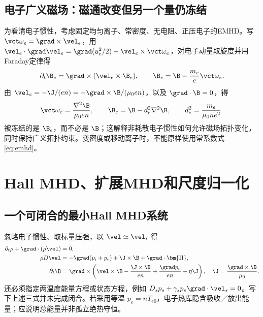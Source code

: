 \subsection{电子广义磁场：磁通改变但另一个量仍冻结}
为看清电子惯性，考虑固定均匀离子、常密度、无电阻、正压电子的EMHD。写 $\vct\omega_e=\grad\times\vel_e$，用
$\vel_e\cdot\grad\vel_e=\grad(u_e^2/2)-\vel_e\times\vct\omega_e$，对电子动量取旋度并用Faraday定律得
\begin{equation}\partial_t\B_e=\grad\times(\vel_e\times\B_e),\qquad
\B_e=\B-{m_e\over e}\vct\omega_e.\label{eq:be}
\end{equation}
由 $\vel_e=-\J/(en)=-\grad\times\B/(\mu_0en)$，以及 $\grad\cdot\B=0$，得
\begin{equation}\vct\omega_e={\nabla^2\B\over\mu_0en},\qquad
\B_e=\B-d_e^2\nabla^2\B,\qquad d_e^2={m_e\over\mu_0ne^2}.\label{eq:emhd}
\end{equation}
被冻结的是 $\B_e$，而不必是 $\B$；这解释非耗散电子惯性如何允许磁场拓扑变化，同时保持广义拓扑约束。变密度或移动离子时，不能原样使用常系数式\eqref{eq:emhd}。

\section{Hall MHD、扩展MHD和尺度归一化}
\subsection{一个可闭合的最小Hall MHD系统}
忽略电子惯性、取标量压强，以 $\vel\simeq\vel_i$ 得
\begin{align}
\partial_t\rho+\grad\cdot(\rho\vel)&=0,\\
\rho D\vel&=-\grad(p_i+p_e)+\J\times\B+\grad\cdot\bm{\Pi},\\
\partial_t\B&=\grad\times\left(\vel\times\B-{\J\times\B\over en}+{\grad p_e\over en}-\eta\J\right),\quad\J={\grad\times\B\over\mu_0}.\label{eq:hallinduction}
\end{align}
还必须指定两温度能量方程或状态方程，例如 $D_sp_s+\gamma_sp_s\grad\cdot\vel_s=0$。写下上述三式并未完成闭合。若采用等温 $p_e=nT_{e0}$，电子热库隐含吸收／放出能量；应说明总能量并非孤立绝热守恒。

